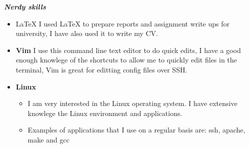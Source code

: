 \documentclass{res}
\begin{document}
\begin{resume}
\vspace{8pt}
\vspace{8pt}
{\sl \textbf{Nerdy skills}}
\begin{itemize}
        \item \LaTeX{} I used \LaTeX{} to prepare reports and assignment write ups for university, I have also used it to write my CV.
        \item \textbf{Vim} I use this command line text editor to do quick edits, I have a good enough knowlege of the shortcuts to allow me to quickly edit files in the terminal, Vim is great for editting config files over SSH.
        \item \textbf{Linux}
        \begin{itemize}
                \item I am very interested in the Linux operating system. I have extensive knowlege the Linux environment and applications.
                \item Examples of applications that I use on a regular basis are: ssh, apache, make and gcc
        \end{itemize}
\end{itemize}

\end{resume} 
\end{document}
